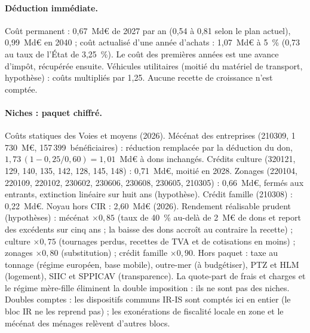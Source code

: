 \paragraph{Déduction immédiate.} Coût permanent : 0,67~Md€ de 2027 par an (0,54 à 0,81 selon le plan actuel), 0,99~Md€ en
2040 ; coût actualisé d'une année d'achats : 1,07~Md€ à 5~\% (0,73 au taux de l'État de 3,25~\%). Le coût des premières
années est une avance d'impôt, récupérée ensuite. Véhicules utilitaires (moitié du matériel de transport, hypothèse) :
coûts multipliés par 1,25. Aucune recette de croissance n'est comptée.

\paragraph{Niches : paquet chiffré.} Coûts statiques des Voies et moyens (2026). Mécénat des entreprises (210309,
1\,730~M€, 157\,399~bénéficiaires) : réduction remplacée par la déduction du don, $1{,}73\,(1-0{,}25/0{,}60) = 1{,}01$~Md€ à
dons inchangés. Crédits culture (320121, 129, 140, 135, 142, 128, 145, 148) : 0,71~Md€, moitié en 2028. Zonages (220104,
220109, 220102, 230602, 230606, 230608, 230605, 210305) : 0,66~Md€, fermés aux entrants, extinction linéaire sur huit ans
(hypothèse). Crédit famille (210308) : 0,22~Md€. Noyau hors CIR : 2,60~Md€ (2026). Rendement réalisable prudent
(hypothèses) : mécénat $\times 0{,}85$ (taux de 40~\% au-delà de 2~M€ de dons et report des excédents sur cinq ans ; la
baisse des dons accroît au contraire la recette) ; culture $\times 0{,}75$ (tournages perdus, recettes de TVA et de
cotisations en moins) ; zonages $\times 0{,}80$ (substitution) ; crédit famille $\times 0{,}90$. Hors paquet : taxe au
tonnage (régime européen, base mobile), outre-mer (à budgétiser), PTZ et HLM (logement), SIIC et SPPICAV (transparence).
La quote-part de frais et charges et le régime mère-fille éliminent la double imposition : ils ne sont pas des niches.
Doubles comptes : les dispositifs communs IR-IS sont comptés ici en entier (le bloc IR ne les reprend pas) ; les
exonérations de fiscalité locale en zone et le mécénat des ménages relèvent d'autres blocs.

